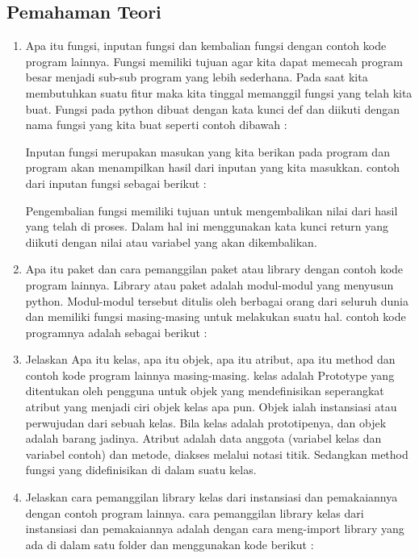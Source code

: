 \subsection{Pemahaman Teori}
\begin{enumerate}
    \item Apa itu fungsi, inputan fungsi dan kembalian fungsi dengan contoh kode program lainnya.
Fungsi memiliki tujuan agar kita dapat memecah program besar menjadi sub-sub program yang lebih sederhana. Pada saat kita membutuhkan suatu fitur maka kita tinggal memanggil fungsi yang telah kita buat. Fungsi pada python dibuat dengan kata kunci def dan diikuti dengan nama fungsi yang kita buat seperti contoh dibawah :
 
Inputan fungsi merupakan masukan yang kita berikan pada program dan program akan menampilkan hasil dari inputan yang kita masukkan. contoh dari inputan fungsi sebagai berikut :
 
Pengembalian fungsi memiliki tujuan untuk mengembalikan nilai dari hasil yang telah di proses. Dalam hal ini menggunakan kata kunci return yang diikuti dengan nilai atau variabel yang akan dikembalikan.
 

    \item Apa itu paket dan cara pemanggilan paket atau library dengan contoh kode program lainnya.
Library atau paket adalah modul-modul yang menyusun python. Modul-modul tersebut ditulis oleh berbagai orang dari seluruh dunia dan memiliki fungsi masing-masing untuk melakukan suatu hal. contoh kode programnya adalah sebagai berikut :
 

    \item Jelaskan Apa itu kelas, apa itu objek, apa itu atribut, apa itu method dan contoh kode program lainnya masing-masing.
kelas adalah Prototype yang ditentukan oleh pengguna untuk objek yang mendefinisikan seperangkat atribut yang menjadi ciri objek kelas apa pun. Objek ialah instansiasi atau perwujudan dari sebuah kelas. Bila kelas adalah prototipenya, dan objek adalah barang jadinya. Atribut adalah data anggota (variabel kelas dan variabel contoh) dan metode, diakses melalui notasi titik. Sedangkan method fungsi yang didefinisikan di dalam suatu kelas.
 

    \item Jelaskan cara pemanggilan library kelas dari instansiasi dan pemakaiannya dengan contoh program lainnya.
cara pemanggilan  library kelas dari instansiasi dan pemakaiannya adalah dengan cara meng-import library yang ada di dalam satu folder dan menggunakan kode berikut :
 


\end{enumerate}
